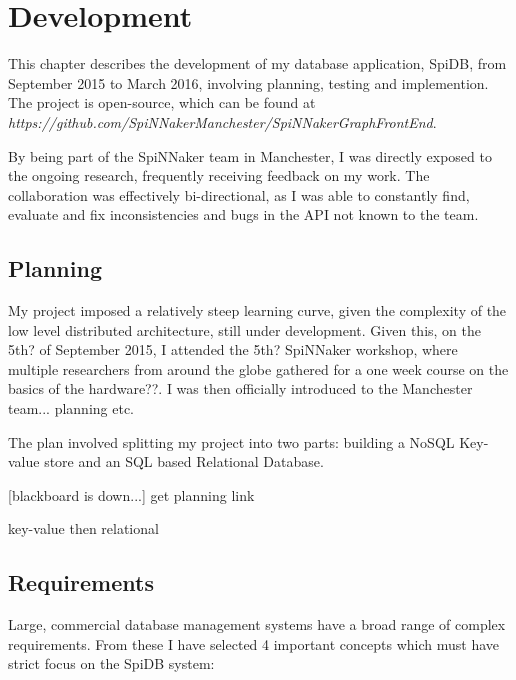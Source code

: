 \chapter{Development}

This chapter describes the development of my database application, SpiDB, from September 2015 to March 2016, involving planning, testing and implemention. The project is open-source, which can be found at
\textit{https://github.com/SpiNNakerManchester/SpiNNakerGraphFrontEnd}.

By being part of the SpiNNaker team in Manchester, I was directly exposed to the ongoing research, frequently receiving feedback on my work. The collaboration was effectively bi-directional, as I was able to constantly find, evaluate and fix inconsistencies and bugs in the API not known to the team.

\section{Planning}
My project imposed a relatively steep learning curve, given the complexity of the low level distributed architecture, still under development. Given this, on the 5th? of September 2015, I attended the 5th? SpiNNaker workshop, where multiple researchers from around the globe gathered for a one week course on the basics of the hardware??. I was then officially introduced to the Manchester team... planning etc.

The plan involved splitting my project into two parts: building a NoSQL Key-value store and an SQL based Relational Database.

[blackboard is down...] get planning link

key-value then relational

\section{Requirements}

Large, commercial database management systems have a broad range of complex requirements. From these I have selected 4 important concepts which must have strict focus on the SpiDB system:

